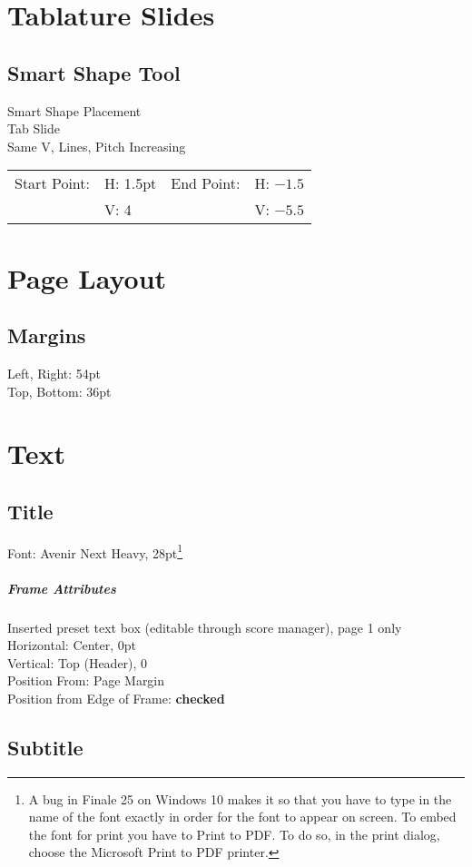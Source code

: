 \documentclass[]{memoir}
\begin{document}
\chapter{Tablature Slides}
\section{Smart Shape Tool}
Smart Shape Placement\\
Tab Slide\\
Same V, Lines, Pitch Increasing\\
\begin{tabular}{l l l l}
Start Point: & H: 1.5pt & End Point: & H: $-1.5$\\
& V: 4 & & V: $-5.5$\\
\end{tabular}
\chapter{Page Layout}
\section{Margins}
Left, Right: 54pt\\
Top, Bottom: 36pt
\chapter{Text}
\section{Title}
Font: Avenir Next Heavy, 28pt\footnote{A bug in Finale 25 on Windows
  10 makes it so that you have to type in the name of the font exactly
  in order for the font to appear on screen. To embed the font for
  print you have to Print to PDF. To do so, in the print dialog,
  choose the Microsoft Print to PDF printer.}

\paragraph{Frame Attributes}
Inserted preset text box (editable through score manager), page 1 only\\
Horizontal: Center, 0pt\\
Vertical: Top (Header), 0\\
Position From: Page Margin\\
Position from Edge of Frame: \textbf{checked}

\section{Subtitle}
\label{sec:subtitle}
\end{document}
